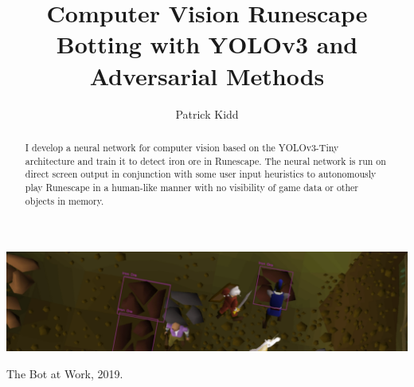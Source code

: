 \documentclass[sigconf]{acmart}
\begin{document}
\title{Computer Vision Runescape Botting with YOLOv3 and Adversarial Methods}

\author{Patrick Kidd}

\renewcommand{\shortauthors}{Patrick Kidd}

\begin{abstract}
  I develop a neural network for computer vision based on the YOLOv3-Tiny architecture and train it to detect iron ore in Runescape. The neural network is run on direct screen output in conjunction with some user input heuristics to autonomously play Runescape in a human-like manner with no visibility of game data or other objects in memory.
\end{abstract}



\begin{teaserfigure}
  \includegraphics[width=\textwidth]{newtop.png}
  \caption{The Bot at Work, 2019.}
  \label{fig:teaser}
\end{teaserfigure}
\end{document}
